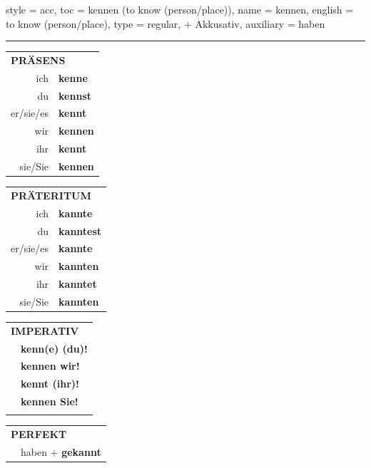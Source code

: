 \begin{verbentry}{
  style = {acc},
  toc = {kennen (to know (person/place))},
  name = {kennen},
  english = {to know (person/place)},
  type = {regular, + Akkusativ},
  auxiliary = {haben}
}
 
    
     \vspace{5pt}

    \hrule
    
    \vspace{5pt}

  \begin{tabular}{rl}
     \multicolumn{2}{l}{\textbf{PRÄSENS} }\\
    ich & \textbf{kenne}\\
    du & \textbf{kennst}\\
    er/sie/es & \textbf{kennt}\\
    wir & \textbf{kennen}\\
    ihr & \textbf{kennt}\\
    sie/Sie & \textbf{kennen}\\
  \end{tabular}
  \hfill
     \begin{tabular}{rl}
    \multicolumn{2}{l}{\textbf{PRÄTERITUM} }\\
    ich & \textbf{kannte}\\
    du & \textbf{kanntest}\\
    er/sie/es & \textbf{kannte}\\
    wir & \textbf{kannten}\\
    ihr & \textbf{kanntet}\\
    sie/Sie & \textbf{kannten}\\
  \end{tabular}
  \hfill
  \begin{tabular}{rl}
     \multicolumn{2}{l}{\textbf{IMPERATIV} }\\
   & \textbf{kenn(e) (du)!}\\
   & \textbf{kennen wir!}\\
   & \textbf{kennt (ihr)!}\\
   & \textbf{kennen Sie!}\\
   & \vspace{10pt}
  \end{tabular}

    \vspace{10pt}

 \begin{tabular}{rl}
     \multicolumn{2}{l}{\textbf{PERFEKT}}\\
  &  haben + \textbf{gekannt}\\
  \end{tabular}
\hfill
   \begin{tabular}{rl}
   

\end{tabular}
\end{verbentry}
